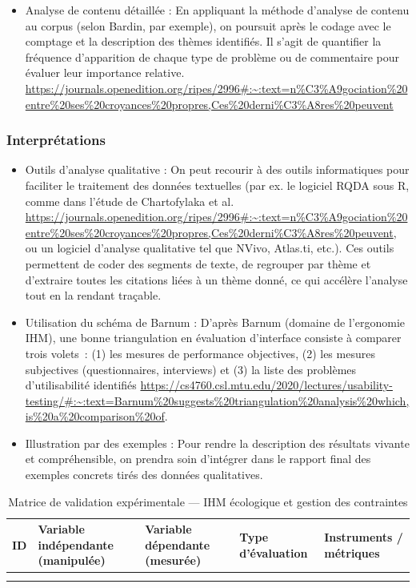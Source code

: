 \documentclass[a4paper,12pt]{article}
\begin{document}
\begin{itemize}
\item Analyse de contenu détaillée : En appliquant la méthode d’analyse de contenu au corpus (selon Bardin, par exemple), on poursuit après le codage avec le comptage et la description des thèmes identifiés. Il s’agit de quantifier la fréquence d’apparition de chaque type de problème ou de commentaire pour évaluer leur importance relative. \url{https://journals.openedition.org/ripes/2996\#:\~:text=n\%C3\%A9gociation\%20entre\%20ses\%20croyances\%20propres,Ces\%20derni\%C3\%A8res\%20peuvent}
\end{itemize}
\subsubsection{Interprétations}
\label{sec:org543fcaa}

\begin{itemize}
\item Outils d’analyse qualitative : On peut recourir à des outils informatiques pour faciliter le traitement des données textuelles (par ex. le logiciel RQDA sous R, comme dans l’étude de Chartofylaka et al. \url{https://journals.openedition.org/ripes/2996\#:\~:text=n\%C3\%A9gociation\%20entre\%20ses\%20croyances\%20propres,Ces\%20derni\%C3\%A8res\%20peuvent}, ou un logiciel d’analyse qualitative tel que NVivo, Atlas.ti, etc.). Ces outils permettent de coder des segments de texte, de regrouper par thème et d’extraire toutes les citations liées à un thème donné, ce qui accélère l’analyse tout en la rendant traçable.
\item Utilisation du schéma de Barnum : D’après Barnum (domaine de l’ergonomie IHM), une bonne triangulation en évaluation d’interface consiste à comparer trois volets : (1) les mesures de performance objectives, (2) les mesures subjectives (questionnaires, interviews) et (3) la liste des problèmes d’utilisabilité identifiés \url{https://cs4760.csl.mtu.edu/2020/lectures/usability-testing/\#:\~:text=Barnum\%20suggests\%20triangulation\%20analysis\%20which,is\%20a\%20comparison\%20of}.
\item Illustration par des exemples : Pour rendre la description des résultats vivante et compréhensible, on prendra soin d’intégrer dans le rapport final des exemples concrets tirés des données qualitatives.
\end{itemize}

\begin{table}[htbp]
\caption{\label{tab:orgbbf0330}Matrice de validation expérimentale — IHM écologique et gestion des contraintes}
\centering
\begin{tabular}{lllll}
ID & Variable indépendante (manipulée) & Variable dépendante (mesurée) & Type d’évaluation & Instruments / métriques\\
\hline
 &  &  &  & \\
 &  &  &  & \\
\end{tabular}
\end{table}
\end{document}
